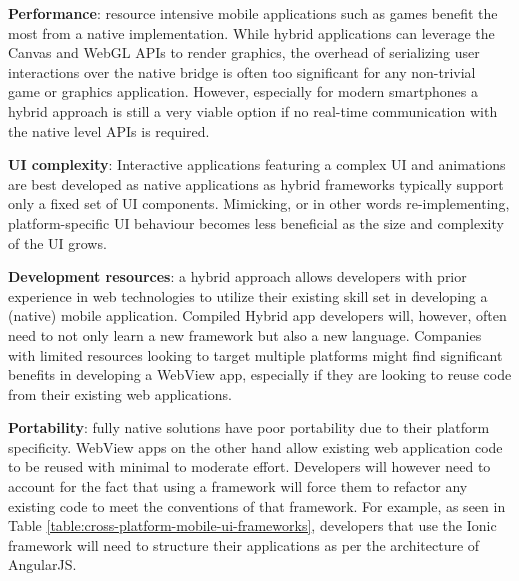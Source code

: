 \documentclass[thesis.tex]{subfiles}
\begin{document}
\begin{itemize}

	\begin{item}
	\textbf{Performance}: resource intensive mobile applications such as games benefit the most from a native implementation. While hybrid applications can leverage the Canvas and WebGL APIs to render graphics, the overhead of serializing user interactions over the native bridge is often too significant for any non-trivial game or graphics application. However, especially for modern smartphones a hybrid approach is still a very viable option if no real-time communication with the native level APIs is required.
	\end{item}

	\begin{item}
	\textbf{UI complexity}: Interactive applications featuring a complex UI and animations are best developed as native applications as hybrid frameworks typically support only a fixed set of UI components. Mimicking, or in other words re-implementing, platform-specific UI behaviour becomes less beneficial as the size and complexity of the UI grows.
	\end{item}

	\begin{item}
	\textbf{Development resources}: a hybrid approach allows developers with prior experience in web technologies to utilize their existing skill set in developing a (native) mobile application. Compiled Hybrid app developers will, however, often need to not only learn a new framework but also a new language. Companies with limited resources looking to target multiple platforms might find significant benefits in developing a WebView app, especially if they are looking to reuse code from their existing web applications.
	\end{item}

	\begin{item}
	\textbf{Portability}: fully native solutions have poor portability due to their platform specificity. WebView apps on the other hand allow existing web application code to be reused with minimal to moderate effort. Developers will however need to account for the fact that using a framework will force them to refactor any existing code to meet the conventions of that framework. For example, as seen in Table \ref{table:cross-platform-mobile-ui-frameworks}, developers that use the Ionic framework will need to structure their applications as per the architecture of AngularJS.
	\end{item}

\end{itemize}
\end{document}
